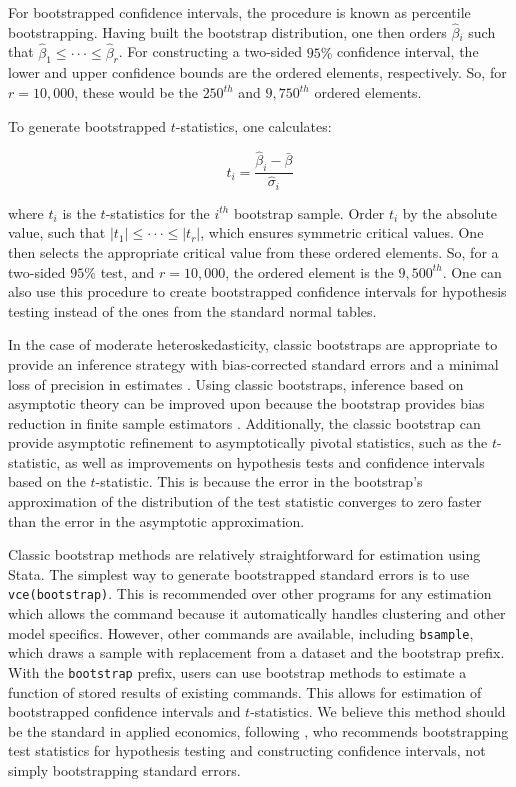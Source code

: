 \documentclass[11pt]{article}
\begin{document}
For bootstrapped confidence intervals, the procedure is known as percentile bootstrapping. Having built the bootstrap distribution, one then orders $\hat{\beta}{_i}$ such that $\hat{\beta}_{1} \leq \cdot \cdot \cdot \leq \hat{\beta}_{r}$. For constructing a two-sided $95\%$ confidence interval, the lower and upper confidence bounds are the ordered elements, respectively. So, for $r = 10,000$, these would be the $250^{th}$ and $9,750^{th}$ ordered elements.

To generate bootstrapped $t$-statistics, one calculates:

\begin{equation}
    t_{i} = \frac{\hat{\beta}_{i} - \bar{\beta}}{\hat{\sigma}_{i}}
\end{equation}

\noindent where $t_i$ is the $t$-statistics for the $i^{th}$ bootstrap sample. Order $t_i$ by the absolute value, such that $| t_1 | \leq \cdot \cdot \cdot \leq | t_r |$, which ensures symmetric critical values. One then selects the appropriate critical value from these ordered elements. So, for a two-sided $95\%$ test, and $r = 10,000$, the ordered element is the $9,500^{th}$. One can also use this procedure to create bootstrapped confidence intervals for hypothesis testing instead of the ones from the standard normal tables.

In the case of moderate heteroskedasticity, classic bootstraps are appropriate to provide an inference strategy with bias-corrected standard errors and a minimal loss of precision in estimates \citep{angrist_mostly_2009}. Using classic bootstraps, inference based on asymptotic theory can be improved upon because the bootstrap provides bias reduction in finite sample estimators \citep{horowitz_bootstrap_2001}. Additionally, the classic bootstrap can provide asymptotic refinement to asymptotically pivotal statistics, such as the $t$-statistic, as well as improvements on hypothesis tests and confidence intervals based on the $t$-statistic. This is because the error in the bootstrap’s approximation of the distribution of the test statistic converges to zero faster than the error in the asymptotic approximation.

Classic bootstrap methods are relatively straightforward for estimation using Stata. The simplest way to generate bootstrapped standard errors is to use \texttt{vce(bootstrap)}. This is recommended over other programs for any estimation which allows the command because it automatically handles clustering and other model specifics. However, other commands are available, including \texttt{bsample}, which draws a sample with replacement from a dataset and the bootstrap prefix. With the \texttt{bootstrap} prefix, users can use bootstrap methods to estimate a function of stored results of existing commands. This allows for estimation of bootstrapped confidence intervals and $t$-statistics. We believe this method should be the standard in applied economics, following \cite{horowitz_bootstrap_2019}, who recommends bootstrapping test statistics for hypothesis testing and constructing confidence intervals, not simply bootstrapping standard errors.
\end{document}
